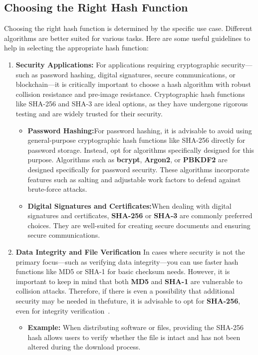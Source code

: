 \documentclass[11pt,a4paper]{article}
\begin{document}
    \subsection*{Choosing the Right Hash Function}
    Choosing the right hash function is determined by the specific use case. Different algorithms are better suited for various tasks. Here are some useful guidelines to help in selecting the appropriate hash function:
        \begin{enumerate}
            \item \textbf{Security Applications:}
            \newline
            For applications requiring cryptographic security—such as password hashing, digital signatures, secure communications, or blockchain—it is critically important to choose a hash algorithm with robust collision resistance and pre-image resistance. Cryptographic hash functions like SHA-256 and SHA-3 are ideal options, as they have undergone rigorous testing and are widely trusted for their security.
            \begin{itemize}
                \item \textbf{Password Hashing:}For password hashing, it is advisable to avoid using general-purpose cryptographic hash functions like SHA-256 directly for password storage. Instead, opt for algorithms specifically designed for this purpose. Algorithms such as \textbf{bcrypt}, \textbf{Argon2}, or \textbf{PBKDF2} are designed specifically for password security. These algorithms incorporate features such as salting and adjustable work factors to defend against brute-force attacks.

                \item \textbf{Digital Signatures and Certificates:}When dealing with digital signatures and certificates, \textbf{SHA-256} or \textbf{SHA-3} are commonly preferred choices. They are well-suited for creating secure documents and ensuring secure communications.

            \end{itemize}


            \item \textbf{Data Integrity and File Verification}
            \newline
            In cases where security is not the primary focus—such as verifying data integrity—you can use faster hash functions like MD5 or SHA-1 for basic checksum needs. However, it is important to keep in mind that both \textbf{MD5} and \textbf{SHA-1} are vulnerable to collision attacks. Therefore, if there is even a possibility that additional security may be needed in thefuture, it is advisable to opt for \textbf{SHA-256}, even for integrity verification~\cite{Integrity}.
                \begin{itemize}
                    \item \textbf{Example:} When distributing software or files, providing the SHA-256 hash allows users to verify whether the file is intact and has not been altered during the download process.


\end{itemize}
\end{enumerate}
\end{document}
